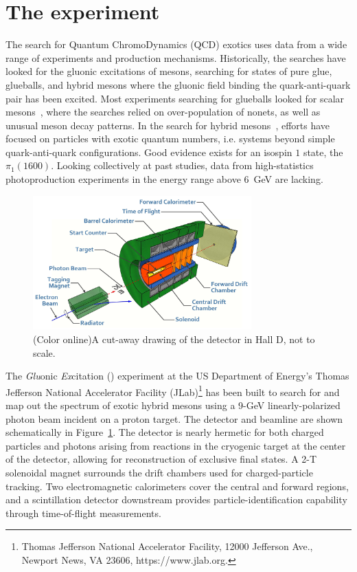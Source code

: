 \section[The \gx{} experiment]{\label{sec:gluexexperiment} The \gx{} experiment}
The search for Quantum ChromoDynamics (QCD) exotics uses data from a wide range of experiments and production mechanisms. Historically, the searches have looked for the gluonic excitations of mesons, searching for states of pure glue, glueballs, and hybrid mesons where the gluonic field binding the quark-anti-quark pair has been excited. Most experiments searching for glueballs looked for scalar mesons~\cite{Crede:2008vw}, where the searches relied on over-population of nonets, as well as unusual meson decay patterns. In the search for hybrid mesons~\cite{Meyer:2010ku,Meyer:2015eta}, efforts have focused on particles with exotic quantum numbers, i.e. systems beyond simple quark-anti-quark configurations. Good evidence exists for an isospin $1$ state, the $\pi_{1}(1600)$. Looking collectively at past studies, data from high-statistics photoproduction experiments in the energy range above $6$~GeV are lacking. 

\begin{figure}[hbt]\centering
\includegraphics[width=0.75\textwidth]{figures/GlueX-graphic.jpg}
\caption[]{\label{fig:gluex_cut-away}(Color online)A cut-away drawing of the \GX{} detector in Hall D, not to scale.}
\end{figure}
The \emph{Glu}onic \emph{Ex}citation (\gx{}) experiment at the 
US Department of Energy's Thomas Jefferson National Accelerator Facility (JLab)\footnote{Thomas Jefferson National Accelerator Facility, 12000 Jefferson Ave., Newport News, VA 23606, https://www.jlab.org.} has been built to search for and map out the spectrum of exotic hybrid mesons using a 9-GeV linearly-polarized photon beam incident on a proton target\cite{gluex-ref}. The \gx{} detector and beamline are shown schematically in Figure~\ref{fig:gluex_cut-away}. The detector is nearly hermetic for both charged particles and photons arising from reactions in the cryogenic target at the center of the detector, allowing for reconstruction of exclusive final states. A 2-T solenoidal magnet surrounds the drift chambers used for charged-particle tracking. Two electromagnetic calorimeters cover the central and forward regions, and a scintillation detector downstream provides particle-identification capability through time-of-flight measurements. 



